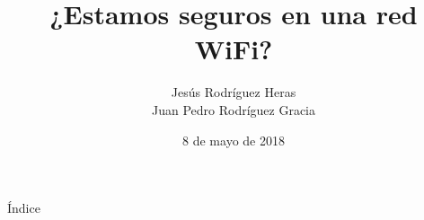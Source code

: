 \documentclass{beamer}
\title{¿Estamos seguros en una red WiFi?}
\author{Jesús Rodríguez Heras \\ Juan Pedro Rodríguez Gracia}
\date{8 de mayo de 2018}
\begin{document}
\begin{frame}
  \titlepage
  
\end{frame}

\begin{frame}{Índice}
  \tableofcontents
\end{frame}



%
%
%
%
\end{document}
